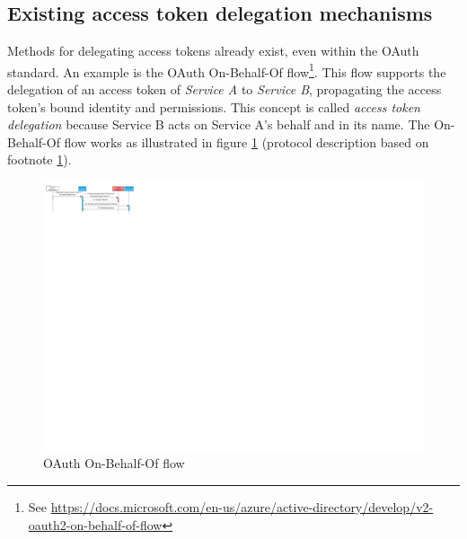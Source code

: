 \subsection{Existing access token delegation mechanisms}
Methods for delegating access tokens already exist, even within the OAuth standard. An example is the OAuth On-Behalf-Of flow\footnote{\label{fn:obo}See \url{https://docs.microsoft.com/en-us/azure/active-directory/develop/v2-oauth2-on-behalf-of-flow}}. This flow supports the delegation of an access token of \textit{Service A} to \textit{Service B}, propagating the access token's bound identity and permissions. This concept is called \textit{access token delegation} because Service B acts on Service A's behalf and in its name. The On-Behalf-Of flow works as illustrated in figure \ref{fig:obo-flow} (protocol description based on footnote \ref{fn:obo}). 

\begin{figure}[H]
    \centering
   \includegraphics[width=1.0\textwidth]{images/macaroons-solid/InteractionDiagram-OBO-Flow.pdf}
    \caption{OAuth On-Behalf-Of flow}
    \label{fig:obo-flow}
\end{figure}

